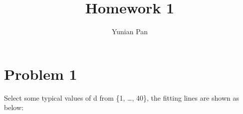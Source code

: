 \documentclass[a4paper,12pt]{article}
\begin{document}
\title{\textbf{Homework 1}}
\author{Yunian Pan}
\maketitle{}

\section{Problem 1}

Select some typical values of d from \{1, \ldots, 40\}, the fitting lines are shown as below:

\begin{figure}[h]
\setcounter{subfigure}{0}
\centering
{}
\\
\centering
{}
\end{figure}
\end{document}
